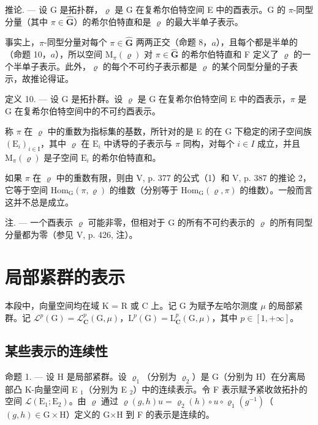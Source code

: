 推论. --- 设 G 是拓扑群，\(\varrho\) 是 G 在复希尔伯特空间 E 中的酉表示。G 的 \(\pi\)-同型分量（其中 \(\pi \in \widehat{\mathbf{G}}\)）的希尔伯特直和是 \(\varrho\) 的最大半单子表示。

事实上，\(\pi\)-同型分量对每个 \(\pi \in \widehat{\mathbf{G}}\) 两两正交（命题 8，\(a\)），且每个都是半单的（命题 10，\(a\)），所以空间 \(\mathrm{M}_{\pi}(\varrho)\) 对 \(\pi \in \widehat{\mathbf{G}}\) 的希尔伯特直和 F 定义了 \(\varrho\) 的一个半单子表示。此外，\(\varrho\) 的每个不可约子表示都是 \(\varrho\) 的某个同型分量的子表示，故推论得证。

定义 10. --- 设 G 是拓扑群。设 \(\varrho\) 是 G 在复希尔伯特空间 E 中的酉表示，\(\pi\) 是 G 在复希尔伯特空间中的不可约酉表示。

称 \(\pi\) 在 \(\varrho\) 中的重数为指标集的基数，所针对的是 E 的在 G 下稳定的闭子空间族 \((\mathrm{E}_i)_{i\in \mathrm{I}}\)，其中 \(\varrho\) 在 \(\mathrm{E}_i\) 中诱导的子表示与 \(\pi\) 同构，对每个 \(i\in I\) 成立，并且 \(\mathrm{M}_{\pi}(\varrho)\) 是子空间 \(\mathrm{E}_i\) 的希尔伯特直和。

如果 \(\pi\) 在 \(\varrho\) 中的重数有限，则由 V, p. 377 的公式（1）和 V, p. 387 的推论 2，它等于空间 \(\mathrm{Hom}_{\mathrm{G}}(\pi, \varrho)\) 的维数（分别等于 \(\mathrm{Hom}_{\mathrm{G}}(\varrho, \pi)\) 的维数）。一般而言这并不总是成立。

注. --- 一个酉表示 \(\varrho\) 可能非零，但相对于 G 的所有不可约表示的 \(\varrho\) 的所有同型分量都为零（参见 V, p. 426, 注）。

\section{局部紧群的表示}

本段中，向量空间均在域 K = R 或 C 上。记 G 为赋予左哈尔测度 \(\mu\) 的局部紧群。记 \(\mathcal{L}^{p}(\mathrm{G}) = \mathcal{L}_{\mathbf{C}}^{p}(\mathrm{G}, \mu)\)，\(\mathrm{L}^{p}(\mathrm{G}) = \mathrm{L}_{\mathbf{C}}^{p}(\mathrm{G}, \mu)\)，其中 \(p \in [1, +\infty]\)。

\subsection{某些表示的连续性}

命题 1. — 设 H 是局部紧群。设 \(\varrho_{1}\)（分别为 \(\varrho_{2}\)）是 G（分别为 H）在分离局部凸 K-向量空间 E \(_{1}\)（分别为 E \(_{2}\)）中的连续表示。令 F 表示赋予紧收敛拓扑的空间 \(\mathcal{L}(\mathrm{E}_{1};\mathrm{E}_{2})\)。由 \(\varrho\) 通过 \(\varrho(g,h)u=\varrho_{2}(h)\circ u\circ\varrho_{1}(g^{-1})\)（\((g,h)\in\mathrm{G}\times\mathrm{H}\)）定义的 G×H 到 F 的表示是连续的。

